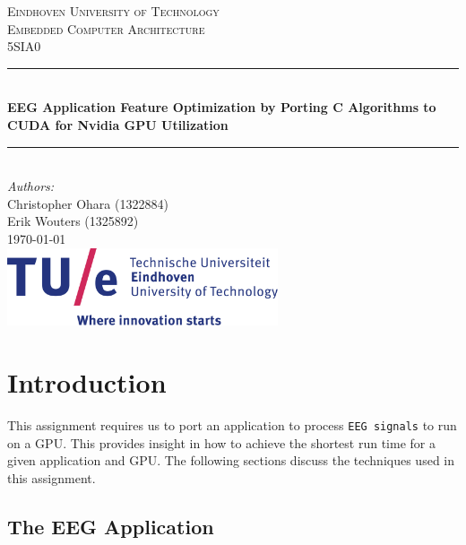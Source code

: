 \documentclass[a4paper]{article}
\begin{document}
\begin{titlepage}

\newcommand{\HRule}{\rule{\linewidth}{0.5mm}} 							%
\center 
 
\textsc{\LARGE Eindhoven University of Technology}\\[1cm]

\textsc{\Large Embedded Computer Architecture } \\[0.2cm]
\textsc{\large 5SIA0 }\\[1cm] 										%
\HRule \\[0.8cm]
{ \huge \bfseries EEG Application Feature Optimization by Porting C Algorithms to CUDA for Nvidia GPU Utilization }\\[0.6cm]								%
\HRule \\[2cm]
\large
\emph{Authors:}\\
Christopher Ohara (1322884) \\
Erik Wouters (1325892) \\	
[1.5cm]	
{\large \today}\\[5cm]
\includegraphics[width=0.6\textwidth]{images/TUE-Logo.jpg}\\[1cm] 	%
\vfill 
\end{titlepage}



\section{Introduction}

This assignment requires us to port an application to process \texttt{EEG signals} to run on a GPU. This provides insight in how to achieve the shortest run time for a given application and GPU. The following sections discuss the techniques used in this assignment.

\subsection{The EEG Application}
\end{document}
